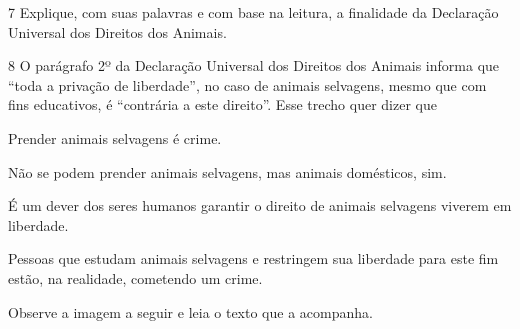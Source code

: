 \num{7} Explique, com suas palavras e com base na leitura, a finalidade
da Declaração Universal dos Direitos dos Animais.


\num{8} O parágrafo 2º da Declaração Universal dos Direitos dos Animais
informa que ``toda a privação de liberdade'', no caso de animais selvagens,
mesmo que com fins educativos, é ``contrária a este direito''. Esse trecho
quer dizer que

\begin{escolha}
\item Prender animais selvagens é crime.
\item Não se podem prender animais selvagens, mas animais domésticos, sim.
\item É um dever dos seres humanos garantir o direito de animais selvagens
viverem em liberdade.  
\item Pessoas que estudam animais selvagens e restringem sua liberdade para
este fim estão, na realidade, cometendo um crime.
\end{escolha}



Observe a imagem a seguir e leia o texto que a acompanha.

